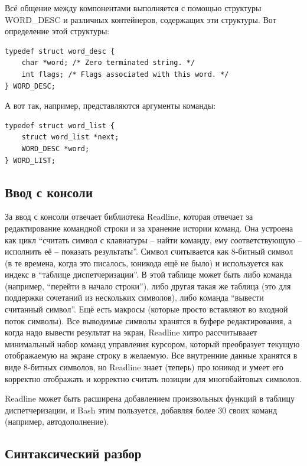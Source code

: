 \documentclass[a5paper]{article}
\begin{document}
Всё общение между компонентами выполняется с помощью структуры WORD\_DESC и различных контейнеров, содержащих эти структуры. Вот определение этой структуры:

\begin{verbatim}
typedef struct word_desc {
    char *word; /* Zero terminated string. */
    int flags; /* Flags associated with this word. */
} WORD_DESC;
\end{verbatim}

А вот так, например, представляются аргументы команды:

\begin{verbatim}
typedef struct word_list {
    struct word_list *next;
    WORD_DESC *word;
} WORD_LIST;
\end{verbatim}

\subsection{Ввод с консоли}

За ввод с консоли отвечает библиотека Readline, которая отвечает за редактирование командной строки и за хранение истории команд. Она устроена как цикл ``считать символ с клавиатуры -- найти команду, ему соответствующую -- исполнить её -- показать результаты''. Символ считывается как 8-битный символ (в те времена, когда это писалось, юникода ещё не было) и используется как индекс в ``таблице диспетчеризации''. В этой таблице может быть либо команда (например, ``перейти в начало строки''), либо другая такая же таблица (это для поддержки сочетаний из нескольких символов), либо команда ``вывести считанный символ''. Ещё есть макросы (которые просто вставляют во входной поток символы). Все выводимые символы хранятся в буфере редактирования, а когда надо вывести результат на экран, Readline хитро рассчитываает минимальный набор команд управления курсором, который преобразует текущую отображаемую на экране строку в желаемую. Все внутренние данные хранятся в виде 8-битных символов, но Readline знает (теперь) про юникод и умеет его корректно отображать и корректно считать позиции для многобайтовых символов.

Readline может быть расширена добавлением произвольных функций в таблицу диспетчеризации, и Bash этим пользуется, добавляя более 30 своих команд (например, автодополнение).

\subsection{Синтаксический разбор}
\end{document}
